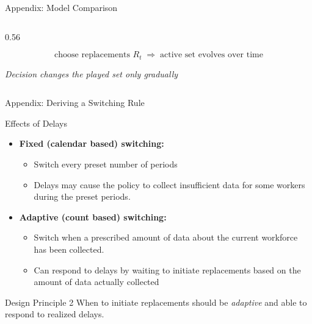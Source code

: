 \documentclass[10pt,aspectratio=169]{beamer}
\begin{document}
\begin{frame}{Appendix: Model Comparison}
\begin{columns}[T,onlytextwidth]
\begin{column}{0.56\textwidth}
        \vspace{-2em}
        \begin{center}
        \[
        \boxed{\text{choose replacements } R_t}
        \;\Longrightarrow\;
        \boxed{\text{active set evolves over time}}
        \]
        \end{center}

        \begin{center}
        \emph{Decision changes the played set only gradually}
        \end{center}
    \end{column}
\end{columns}
\end{frame}

\begin{frame}{Appendix: Deriving a Switching Rule}
    \begin{block}{Effects of Delays}
    \begin{itemize}
        \item \textbf{Fixed (calendar based) switching:}
        \begin{itemize}
            \item Switch every preset number of periods
            \item Delays may cause the policy to collect insufficient data for some workers during the preset periods.
        \end{itemize}
        \vspace{0.3em}
        \item \textbf{Adaptive (count based) switching:}
        \begin{itemize}
            \item Switch when a prescribed amount of data about the current workforce has been collected.
            \item Can respond to delays by waiting to initiate replacements based on the amount of data actually collected
        \end{itemize}
    \end{itemize}
    \end{block}
    
    \vspace{0.5em}
    
    \begin{alertblock}{Design Principle 2}
        When to initiate replacements should be \emph{adaptive} and able to respond to realized delays.
    \end{alertblock}
\end{frame}
\end{document}
